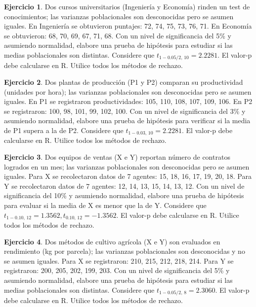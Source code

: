 \documentclass[
  11pt,
]{book}
\theoremstyle{definition}
\theoremstyle{definition}
\theoremstyle{definition}
\newtheorem{exercise}{Ejercicio}[chapter]
\theoremstyle{definition}
\theoremstyle{remark}
\begin{document}
\begin{exercise}
Dos cursos universitarios (Ingeniería y Economía) rinden un test de conocimientos; las varianzas poblacionales son desconocidas pero se asumen iguales. En Ingeniería se obtuvieron puntajes: 72, 74, 75, 73, 76, 71. En Economía se obtuvieron: 68, 70, 69, 67, 71, 68. Con un nivel de significancia del 5\% y asumiendo normalidad, elabore una prueba de hipótesis para estudiar si las medias poblacionales son distintas. Considere que \(t_{1-0.05/2,\,10}=2.2281\). El valor-p debe calcularse en R. Utilice todos los métodos de rechazo.
\end{exercise}

\begin{exercise}
Dos plantas de producción (P1 y P2) comparan su productividad (unidades por hora); las varianzas poblacionales son desconocidas pero se asumen iguales. En P1 se registraron productividades: 105, 110, 108, 107, 109, 106. En P2 se registraron: 100, 98, 101, 99, 102, 100. Con un nivel de significancia del 3\% y asumiendo normalidad, elabore una prueba de hipótesis para verificar si la media de P1 supera a la de P2. Considere que \(t_{1-0.03,\,10}=2.2281\). El valor-p debe calcularse en R. Utilice todos los métodos de rechazo.
\end{exercise}

\begin{exercise}
Dos equipos de ventas (X e Y) reportan número de contratos logrados en un mes; las varianzas poblacionales son desconocidas pero se asumen iguales. Para X se recolectaron datos de 7 agentes: 15, 18, 16, 17, 19, 20, 18. Para Y se recolectaron datos de 7 agentes: 12, 14, 13, 15, 14, 13, 12. Con un nivel de significancia del 10\% y asumiendo normalidad, elabore una prueba de hipótesis para evaluar si la media de X es menor que la de Y. Considere que \(t_{1-0.10,\,12}=1.3562, t_{0.10,\,12}=-1.3562\). El valor-p debe calcularse en R. Utilice todos los métodos de rechazo.
\end{exercise}

\begin{exercise}
Dos métodos de cultivo agrícola (X e Y) son evaluados en rendimiento (kg por parcela); las varianzas poblacionales son desconocidas y no se asumen iguales. Para X se registraron: 210, 215, 212, 218, 214. Para Y se registraron: 200, 205, 202, 199, 203. Con un nivel de significancia del 5\% y asumiendo normalidad, elabore una prueba de hipótesis para estudiar si las medias poblacionales son distintas. Considere que \(t_{1-0.05/2,\,8}=2.3060\). El valor-p debe calcularse en R. Utilice todos los métodos de rechazo.
\end{exercise}
\end{document}
